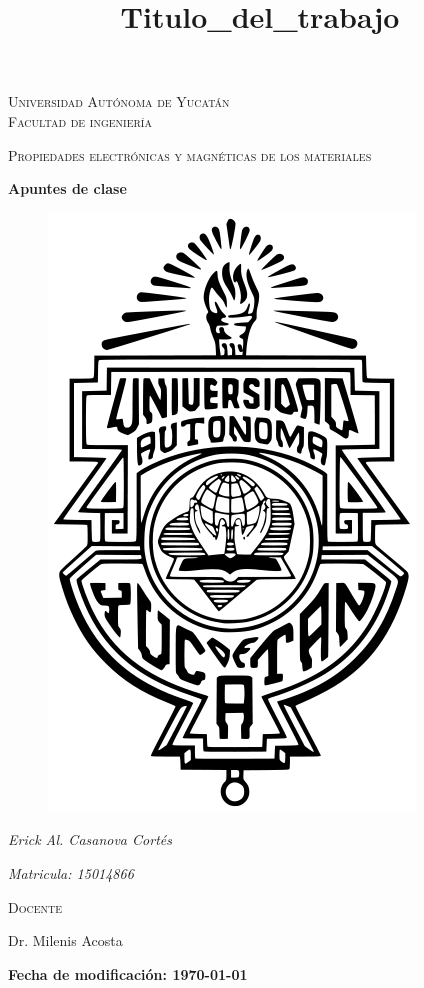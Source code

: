 \documentclass[11pt]{report}
\theoremstyle{plain}
\theoremstyle{definition}
\begin{document}
\begin{titlepage}
\title{Titulo_del_trabajo}


	\centering
	{\scshape\LARGE Universidad Autónoma de Yucatán  \\ Facultad de ingeniería\par}
	\vspace{1cm}
	{\scshape\Large Propiedades electrónicas y magnéticas de los materiales\par}
	\vspace{1.5cm}
	{\huge\bfseries Apuntes de clase\par}
	\vspace{0.7cm}
	{\begin{figure}[!h]
	\centering
    \includegraphics[scale=0.3]{UADY.png}
	\end{figure}}
	\vspace{0.7cm}
	{\Large\itshape Erick Al. Casanova Cortés\par}
	{\Large\itshape Matricula: 15014866\par}
	\vfill
	{\scshape\Large Docente\par
	Dr. Milenis Acosta\par}
	\vfill
	{\Large{\bfseries Fecha de modificación: \today } }

	\vfill
	
\end{titlepage}
\end{document}
